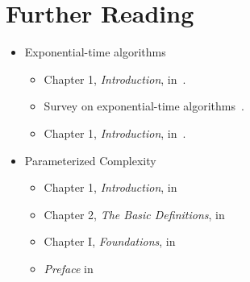 \section{Further Reading}

\begin{frame}

	\begin{itemize}
		\item Exponential-time algorithms
		      \begin{itemize}
			      \item Chapter 1, \emph{Introduction}, in~\cite{FominK10}.
			      \item Survey on exponential-time algorithms~\cite{Woeginger01}.
			      \item Chapter 1, \emph{Introduction}, in~\cite{Gaspers10}.
		      \end{itemize}
		\item Parameterized Complexity
		      \begin{itemize}
			      \item Chapter 1, \emph{Introduction}, in~\cite{CyganFKL+15}
			      \item Chapter 2, \emph{The Basic Definitions}, in~\cite{DowneyF13}
			      \item Chapter I, \emph{Foundations}, in~\cite{Niedermeier06}
			      \item \emph{Preface} in~\cite{FlumG06}
		      \end{itemize}
	\end{itemize}

\end{frame}

\begin{frame}[t, allowframebreaks]
	\printbibliography{}
\end{frame}


